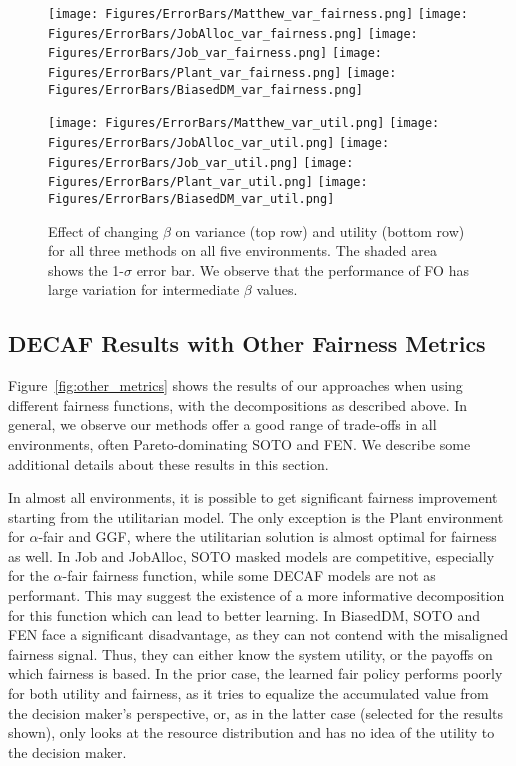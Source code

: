 \begin{figure*}[t]
    \centering
    \texttt{[image: Figures/ErrorBars/Matthew\_var\_fairness.png]}
    \texttt{[image: Figures/ErrorBars/JobAlloc\_var\_fairness.png]}
    \texttt{[image: Figures/ErrorBars/Job\_var\_fairness.png]}
    \texttt{[image: Figures/ErrorBars/Plant\_var\_fairness.png]}
    \texttt{[image: Figures/ErrorBars/BiasedDM\_var\_fairness.png]}
    
    \texttt{[image: Figures/ErrorBars/Matthew\_var\_util.png]}
    \texttt{[image: Figures/ErrorBars/JobAlloc\_var\_util.png]}
    \texttt{[image: Figures/ErrorBars/Job\_var\_util.png]}
    \texttt{[image: Figures/ErrorBars/Plant\_var\_util.png]}
    \texttt{[image: Figures/ErrorBars/BiasedDM\_var\_util.png]}
    \caption{Effect of changing $\beta$ on variance (top row) and utility (bottom row) for all three methods on all five environments. 
    The shaded area shows the 1-$\sigma$ error bar. 
    We observe that the performance of FO has large variation for intermediate $\beta$ values.}
    \label{fig:error-bars}
\end{figure*}

\subsection{DECAF Results with Other Fairness Metrics}
Figure~\ref{fig:other_metrics} shows the results of our approaches when using different fairness functions, with the decompositions as described above.  In general, we observe our methods offer a good range of trade-offs in all environments, often Pareto-dominating SOTO and FEN. We describe some additional details about these results in this section.

In almost all environments, it is possible to get significant fairness improvement starting from the utilitarian model. The only exception is the Plant environment for $\alpha$-fair and GGF, where the utilitarian solution is almost optimal for fairness as well. In Job and JobAlloc, SOTO masked models are competitive, especially for the $\alpha$-fair fairness function, while some DECAF models are not as performant. This may suggest the existence of a more informative decomposition for this function which can lead to better learning. In BiasedDM, SOTO and FEN face a significant disadvantage, as they can not contend with the misaligned fairness signal. Thus, they can either know the system utility, or the payoffs on which fairness is based. In the prior case, the learned fair policy performs poorly for both utility and fairness, as it tries to equalize the accumulated value from the decision maker's perspective, or, as in the latter case (selected for the results shown), only looks at the resource distribution and has no idea of the utility to the decision maker.

